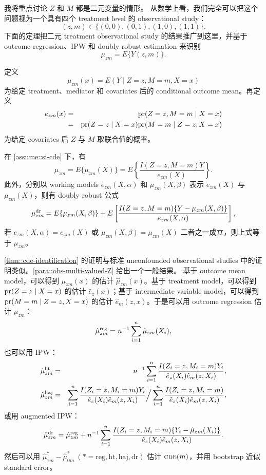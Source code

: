 我将重点讨论 $Z$ 和 $M$ 都是二元变量的情形。
从数学上看，我们完全可以把这个问题视为一个具有四个 treatment level 的 observational study：
$$
(z,m) \in \{  (0,0), (0,1), (1,0), (1,1) \} .
$$
下面的定理把二元 treatment observational study 的结果推广到这里，并基于 outcome regression、IPW 和 doubly robust estimation 来识别
$$
\mu_{zm} = E\{  Y(z,m) \}.
$$


定义
$$ 
\mu_{zm}(x) = E(Y\mid Z=z,M=m, X=x) 
$$
为给定 treatment、mediator 和 covariates 后的 conditional outcome mean。再定义
\begin{eqnarray*}
e_{zm}(x)  &=&  \textup{pr}(Z=z,M=m\mid X=x)  \\
&=& \textup{pr}(Z=z\mid X=x) \textup{pr}( M=m\mid Z=z, X=x)
\end{eqnarray*} 
为给定 covariates 后 $Z$ 与 $M$ 取联合值的概率。

\begin{theorem}
\label{thm::cde-identification}
在 \cref{assume::si-cde} 下，有
$$
\mu_{zm} = E\{  \mu_{zm}(X) \}
= E \left\{   \frac{I(Z=z, M=m) Y}{  e_{zm}(X)  }  \right\} .
$$
此外，分别以 working models $e_{zm}(X, \alpha) $ 和 $\mu_{zm}(X, \beta) $ 表示 $e_{zm}(X) $ 与 $\mu_{zm}(X) $，则有 doubly robust 公式
$$
\mu_{zm}^{\textup{dr}}  = E\{  \mu_{zm}(X, \beta) \} + E \left[   \frac{I(Z=z, M=m) \{ Y - \mu_{zm}(X, \beta)  \}}{  e_{zm}(X, \alpha)  }  \right],
$$
若 $e_{zm}(X, \alpha) = e_{zm}(X)$ 或 $\mu_{zm}(X, \beta)  = \mu_{zm}(X)$ 二者之一成立，则上式等于 $\mu_{zm} $。
\end{theorem}



\cref{thm::cde-identification} 的证明与标准 unconfounded observational studies 中的证明类似。\cref{para::obs-multi-valued-Z} 给出一个一般结果。
基于 outcome mean model，可以得到 $\mu_{zm}(x)$ 的估计 $\hat{\mu}_{zm}(x) $。基于 treatment model，可以得到 $\textup{pr}(Z=z\mid X = x)$ 的估计 $\hat{e}_z(x)$；基于 intermediate variable model，可以得到 $\textup{pr}(M=m\mid Z=z, X=x)$ 的估计 $\hat{e}_m(z,x)$。于是可以用 outcome regression 估计 $\mu_{zm} $：
$$
\hat{\mu}_{zm}^\text{reg} = n^{-1} \sum_{i=1}^n  \hat{\mu}_{zm}(X_i),
$$
也可以用 IPW：
\begin{eqnarray*}
\hat{\mu}_{zm}^\text{ht} &=& n^{-1}\sum_{i=1}^n  \frac{  I(Z_i=z, M_i=m) Y_i  }{  \hat{e}_z(X_i)  \hat{e}_m(z,X_i)  } , \\
\hat{\mu}_{zm}^\text{haj} &=&  \sum_{i=1}^n  \frac{  I(Z_i=z, M_i=m) Y_i  }{  \hat{e}_z(X_i)  \hat{e}_m(z,X_i)  } \Big /  \sum_{i=1}^n  \frac{  I(Z_i=z, M_i=m)    }{  \hat{e}_z(X_i)  \hat{e}_m(z,X_i)  }, 
\end{eqnarray*}
或用 augmented IPW：
$$
\hat{\mu}_{zm}^\text{dr} = \hat{\mu}_{zm}^\text{reg}  +  n^{-1} \sum_{i=1}^n  \frac{  I(Z_i=z, M_i=m) \{ Y_i - \hat{\mu}_{zm}(X_i)\}   }{  \hat{e}_z(X_i)  \hat{e}_m(z,X_i)  } .
$$
然后可以用 $\hat{\mu}_{1m}^* - \hat{\mu}_{0m}^*\ (*=\text{reg}, \text{ht}, \text{haj}, \text{dr} )$ 估计 $\textsc{cde}(m)$，并用 bootstrap 近似 standard error。




